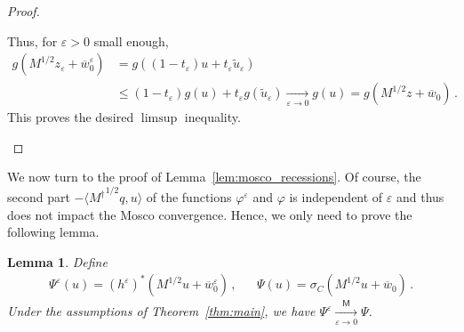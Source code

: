 \documentclass[11pt,english,reqno]{article}
\renewcommand{\leq}{\leqslant}
\theoremstyle{plain}
\newtheorem{lem}[proposition]{Lemma}
\theoremstyle{definition}
\theoremstyle{remark}
\numberwithin{equation}{section}
\begin{document}
\begin{proof}
\begin{itemize}
		Thus, for $\varepsilon > 0$ small enough,
		\begin{align*}
			g(M^{1/2} z_\varepsilon + \overline{w}_0^\varepsilon) &= g((1-t_\varepsilon) u + t_\varepsilon \widetilde{u}_\varepsilon) \\
			&\leq (1-t_\varepsilon) g(u) + t_\varepsilon g(\widetilde{u}_\varepsilon) \xrightarrow[\varepsilon\to 0]{} g(u) = g(M^{1/2} z + \overline{w}_0) \, .
		\end{align*}
		This proves the desired $\limsup$ inequality.
	\end{itemize}
\end{proof}

We now turn to the proof of Lemma~\ref{lem:mosco_recessions}. Of course, the second part $-\langle {M^\dagger}^{1/2} q,u \rangle$ of the functions $\varphi^\varepsilon$ and $\varphi$ is independent of $\varepsilon$ and thus does not impact the Mosco convergence. Hence, we only need to prove the following lemma.

\begin{lem}
	Define 
	\begin{align*}
		\Psi^\varepsilon(u) = (h^\varepsilon)^*(M^{1/2} u + \overline{w}_0^\varepsilon) \, , && \Psi(u) = \sigma_C(M^{1/2} u + \overline{w}_0) \, .
	\end{align*}
	Under the assumptions of Theorem~\ref{thm:main}, we have $\Psi^\varepsilon \xrightarrow[\varepsilon\to 0]{\mathsf{M}} \Psi$.
\end{lem}
\end{document}
